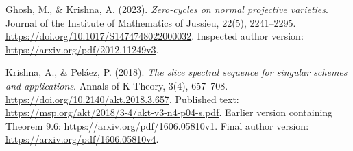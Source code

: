 Ghosh, M., \& Krishna, A. (2023).
\emph{Zero-cycles on normal projective varieties}.
Journal of the Institute of Mathematics of Jussieu, 22(5), 2241--2295.
\url{https://doi.org/10.1017/S1474748022000032}.
Inspected author version:
\url{https://arxiv.org/pdf/2012.11249v3}.

Krishna, A., \& Pel\'aez, P. (2018).
\emph{The slice spectral sequence for singular schemes and applications}.
Annals of K-Theory, 3(4), 657--708.
\url{https://doi.org/10.2140/akt.2018.3.657}.
Published text:
\url{https://msp.org/akt/2018/3-4/akt-v3-n4-p04-s.pdf}.
Earlier version containing Theorem 9.6:
\url{https://arxiv.org/pdf/1606.05810v1}.
Final author version:
\url{https://arxiv.org/pdf/1606.05810v4}.

